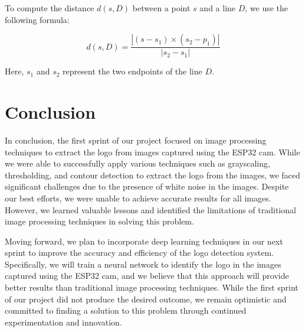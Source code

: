 To compute the distance $d(s, D)$ between a point $s$ and a line $D$, we use the following formula:

\begin{equation*}
    d(s, D) = \frac{|(s - s_1) \times (s_2 - p_1)|}{|s_2 - s_1|}
\end{equation*}

Here, $s_1$ and $s_2$ represent the two endpoints of the line $D$.
\vspace{1em}


\section*{Conclusion}
In conclusion, the first sprint of our project focused on image processing techniques to extract the logo from images captured using the ESP32 cam. While we were able to successfully apply various techniques such as grayscaling, thresholding, and contour detection to extract the logo from the images, we faced significant challenges due to the presence of white noise in the images. Despite our best efforts, we were unable to achieve accurate results for all images. However, we learned valuable lessons and identified the limitations of traditional image processing techniques in solving this problem.

Moving forward, we plan to incorporate deep learning techniques in our next sprint to improve the accuracy and efficiency of the logo detection system. Specifically, we will train a neural network to identify the logo in the images captured using the ESP32 cam, and we believe that this approach will provide better results than traditional image processing techniques. While the first sprint of our project did not produce the desired outcome, we remain optimistic and committed to finding a solution to this problem through continued experimentation and innovation.
\newpage

%



%